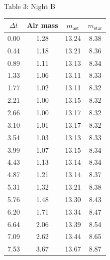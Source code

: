 \begin{center}
Table 3: Night B

\begin{tabular}{c|c|c|c}
$\Delta t$ & Air mass & $m_{\mathrm{ast}}$ & $m_{\mathrm{star}}$ \\
\hline
0.00 & 1.28 & 13.24 & 8.38 \\
0.44 & 1.18 & 13.21 & 8.36 \\
0.89 & 1.11 & 13.13 & 8.34 \\
1.33 & 1.06 & 13.11 & 8.33 \\
1.77 & 1.02 & 13.11 & 8.32 \\
2.21 & 1.00 & 13.15 & 8.32 \\
2.66 & 1.00 & 13.17 & 8.32 \\
3.10 & 1.01 & 13.17 & 8.32 \\
3.54 & 1.03 & 13.13 & 8.33 \\
3.99 & 1.07 & 13.15 & 8.34 \\
4.43 & 1.13 & 13.14 & 8.34 \\
4.87 & 1.21 & 13.14 & 8.37 \\
5.31 & 1.32 & 13.21 & 8.38 \\
5.76 & 1.48 & 13.30 & 8.43 \\
6.20 & 1.71 & 13.34 & 8.47 \\
6.64 & 2.06 & 13.39 & 8.54 \\
7.09 & 2.62 & 13.44 & 8.65 \\
7.53 & 3.67 & 13.67 & 8.87 \\
\end{tabular}
\end{center}

